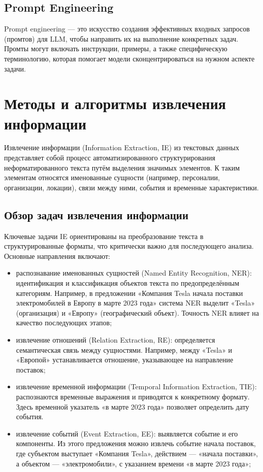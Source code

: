 \subsection{Prompt Engineering}

Prompt engineering — это искусство создания эффективных входных запросов (промтов) для LLM, чтобы направить их на выполнение конкретных задач. 
Промты могут включать инструкции, примеры, а также специфическую терминологию, которая помогает модели сконцентрироваться на нужном аспекте задачи. 

\section{Методы и алгоритмы извлечения информации}

Извлечение информации (Information Extraction, IE) из текстовых данных представляет собой процесс автоматизированного структурирования 
неформатированного текста путём выделения значимых элементов. 
К таким элементам относятся именованные сущности (например, персоналии, организации, локации), связи между ними, события и временные характеристики. 

\subsection{Обзор задач извлечения информации}

Ключевые задачи IE ориентированы на преобразование текста в структурированные форматы, что критически важно для последующего анализа. Основные направления включают:

\begin{itemize}
    \item распознавание именованных сущностей (Named Entity Recognition, NER): идентификация и классификация объектов текста по предопределённым категориям. Например, в предложении «Компания Tesla начала поставки электромобилей в Европу в марте 2023 года» система NER выделит «Tesla» (организация) и «Европу» (географический объект). Точность NER влияет на качество последующих этапов;

    \item извлечение отношений (Relation Extraction, RE): определяется семантическая связь между сущностями. Например, между «Tesla» и «Европой» устанавливается отношение, указывающее на направление поставок;

    \item извлечение временной информации (Temporal Information Extraction, TIE): распознаются временные выражения и приводятся к конкретному формату. Здесь временной указатель «в марте 2023 года» позволяет определить дату события.

    \item извлечение событий (Event Extraction, EE): выявляется событие и его компоненты. Из этого предложения можно извлечь событие начала поставок, где субъектом выступает «Компания Tesla», действием — «начала поставки», а объектом — «электромобили», с указанием времени «в марте 2023 года»;
\end{itemize}


